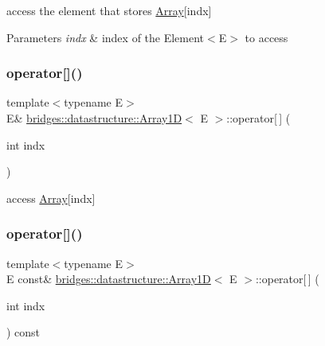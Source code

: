 access the element that stores \hyperlink{classbridges_1_1datastructure_1_1_array}{Array}\mbox{[}indx\mbox{]} 


\begin{DoxyParams}{Parameters}
{\em indx} & index of the Element$<$\+E$>$ to access \\
\hline
\end{DoxyParams}
\mbox{\label{classbridges_1_1datastructure_1_1_array1_d_ac0e28b33231ba865d00dbaf1ad4d1b5b}} 
\subsubsection{\texorpdfstring{operator[]()}{operator[]()}\hspace{0.1cm}{\footnotesize\ttfamily [1/2]}}
{\footnotesize\ttfamily template$<$typename E$>$ \\
E\& \hyperlink{classbridges_1_1datastructure_1_1_array1_d}{bridges\+::datastructure\+::\+Array1D}$<$ E $>$\+::operator\mbox{[}$\,$\mbox{]} (\begin{DoxyParamCaption}\item[{int}]{indx }\end{DoxyParamCaption})\hspace{0.3cm}{\ttfamily [inline]}}



access \hyperlink{classbridges_1_1datastructure_1_1_array}{Array}\mbox{[}indx\mbox{]} 

\mbox{\label{classbridges_1_1datastructure_1_1_array1_d_a3eee632c4ba3bce5694da00f07e1ac65}} 
\subsubsection{\texorpdfstring{operator[]()}{operator[]()}\hspace{0.1cm}{\footnotesize\ttfamily [2/2]}}
{\footnotesize\ttfamily template$<$typename E$>$ \\
E const\& \hyperlink{classbridges_1_1datastructure_1_1_array1_d}{bridges\+::datastructure\+::\+Array1D}$<$ E $>$\+::operator\mbox{[}$\,$\mbox{]} (\begin{DoxyParamCaption}\item[{int}]{indx }\end{DoxyParamCaption}) const\hspace{0.3cm}{\ttfamily [inline]}}




